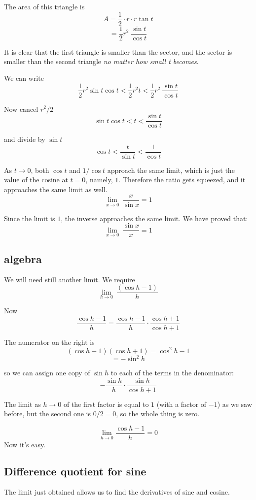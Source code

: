 \documentclass[11pt, oneside]{article}
\begin{document}
The area of this triangle is
\[   A = \frac{1}{2} \cdot r \cdot r \tan t   \]
\[    =  \frac{1}{2} r^2 \ \frac{\sin t}{\cos t}  \]

It is clear that the first triangle is smaller than the sector, and the sector is smaller than the second triangle \emph{no matter how small t becomes}.

We can write
\[    \frac{1}{2} r^2 \sin t \cos t < \frac{1}{2} r^2 t < \frac{1}{2} r^2 \ \frac{\sin t}{\cos t}  \]

Now cancel $r^2/2$
\[    \sin t \cos t < t < \frac{\sin t}{\cos t}  \]

and divide by $\sin t$
\[    \cos t < \frac{t}{\sin t} < \frac{1}{\cos t}  \]

As $t \rightarrow 0$, both $\cos t$ and $1/\cos t$ approach the same limit, which is just the value of the cosine at $t=0$, namely, $1$.  Therefore the ratio gets squeezed, and it approaches the same limit as well.  
\[    \lim_{x \rightarrow 0} \ \frac{x}{\sin x} = 1  \] 

Since the limit is $1$, the inverse approaches the same limit.  We have proved that:
\[  \lim_{x \rightarrow 0} \ \frac{\sin x}{x} = 1  \] 

\subsection*{algebra}

We will need still another limit.  We require
\[ \lim_{h \rightarrow 0} \ \frac{(\cos h - 1)}{h} \]

Now
\[ \frac{\cos h - 1}{h}  =  \frac{\cos h - 1}{h}  \cdot \frac{\cos h + 1}{\cos h + 1} \]

The numerator on the right is
\[ (\cos h - 1)(\cos h + 1) = \cos^2 h - 1 \]
\[ = -\sin^2 h \]

so we can assign one copy of $\sin h$ to each of the terms in the denominator:
\[  - \frac{\sin h}{h} \cdot \frac{\sin h}{\cos h + 1} \]

The limit as $h \rightarrow 0$ of the first factor is equal to $1$ (with a factor of $-1$) as we saw before, but the second one is $0/2 = 0$, so the whole thing is zero.

\[ \lim_{h \rightarrow 0} \frac{\cos h - 1}{h} = 0 \]
Now it's easy.

\subsection*{Difference quotient for sine}
The limit just obtained allows us to find the derivatives of sine and cosine.  
\end{document}
